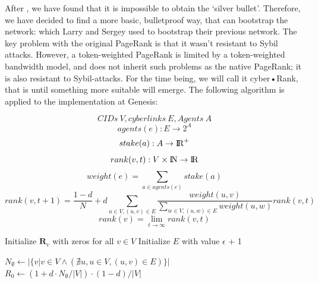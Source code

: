 \documentclass[8pt,oneside]{amsart}
\newcommand{\linkred}[2]{\href{#1}{\color{red}{#2}}}
\begin{document}
\begin{Abstract}
After \linkred{https://arxiv.org/pdf/1709.09002.pdf}{some research}, we have found that it is impossible to obtain the ‘silver bullet’. Therefore, we have decided to find a more basic, bulletproof way, that can bootstrap the network: \linkred{http://ilpubs.stanford.edu:8090/422/1/1999-66.pdf}{the rank} which Larry and Sergey used to bootstrap their previous network. The key problem with the original PageRank is that it wasn't resistant to Sybil attacks. However, a token-weighted PageRank is limited by a token-weighted bandwidth model, and does not inherit such problems as the native PageRank; it is also resistant to Sybil-attacks. For the time being, we will call it cyber•Rank, that is until something more suitable will emerge. The following algorithm is applied to the implementation at Genesis:

$$ CIDs \ V, cyberlinks \ E, Agents \ A $$
$$agents(e): E \rightarrow 2^{A}$$
$$stake(a): A \rightarrow {\rm I\!R}^+ $$
$$rank(v, t): V \times {\rm I\!N} \rightarrow {\rm I\!R} $$
$$weight(e) = \sum\limits_{a \in agents(e)}{stake(a)}$$
$$rank(v, t + 1) = \frac{1 - d}{N} + d\sum\limits_{u \in V, (u, v) \in E}{\frac{weight(u, v)}{\sum_{w \in V, (u, w) \in E}{weight(u, w)}}rank(v, t)} $$
$$rank(v) = \lim\limits_{t \rightarrow \infty} rank(v, t)$$
\begin{algorithm}


\BlankLine
Initialize $\textbf{R}_{v}$ with zeros for all $v \in V$\;
Initialize $E$ with value $\epsilon$ + 1\;

\BlankLine
$N_{\emptyset} \leftarrow |\{v|v \in V \land (\nexists u, u \in V, (u, v) \in E )\}|$ \;
$R_{0} \leftarrow (1 + d \cdot N_{\emptyset} / |V|) \cdot (1 - d) / |V| $ \;

\BlankLine
{}
\end{algorithm}
\end{Abstract}
\end{document}
